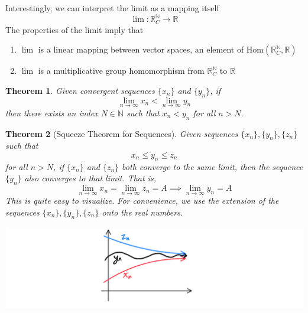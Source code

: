 \documentclass{article}
\newtheorem{theorem}{Theorem}[section]
\theoremstyle{remark}
\theoremstyle{definition}
\begin{document}
Interestingly, we can interpret the limit as a mapping itself
\[\lim: \mathbb{R}^\mathbb{N}_C \longrightarrow \mathbb{R}\]
The properties of the limit imply that 
\begin{enumerate}
    \item $\lim$ is a linear mapping between vector spaces, an element of Hom$(\mathbb{R}^\mathbb{N}_C, \mathbb{R})$
    \item $\lim$ is a multiplicative group homomorphism from $\mathbb{R}^\mathbb{N}_C$ to $\mathbb{R}$
\end{enumerate}

\begin{theorem}
Given convergent sequences $\{x_n\}$ and $\{y_n\}$, if 
\[ \lim_{n \rightarrow \infty} x_n < \lim_{n \rightarrow \infty} y_n\]
then there exists an index $N \in \mathbb{N}$ such that $x_n < y_n$ for all $n > N$. 
\end{theorem}

\begin{theorem}[Squeeze Theorem for Sequences]
Given sequences $\{x_n\}, \{y_n\}, \{z_n\}$ such that 
\[x_n \leq y_n \leq z_n\]
for all $n > N$, if $\{x_n\}$ and $\{z_n\}$ both converge to the same limit, then the sequence $\{y_n\}$ also converges to that limit. That is, 
\[\lim_{n \rightarrow \infty} x_n = \lim_{n \rightarrow \infty} z_n = A \implies \lim_{n \rightarrow \infty} y_n = A\]
This is quite easy to visualize. For convenience, we use the extension of the sequences $\{x_n\}, \{y_n\}, \{z_n\}$ onto the real numbers. 
\begin{center}
    \includegraphics[scale=0.3]{img/Sequence_Squeeze_Theorem.PNG}
\end{center}
\end{theorem}
\end{document}
